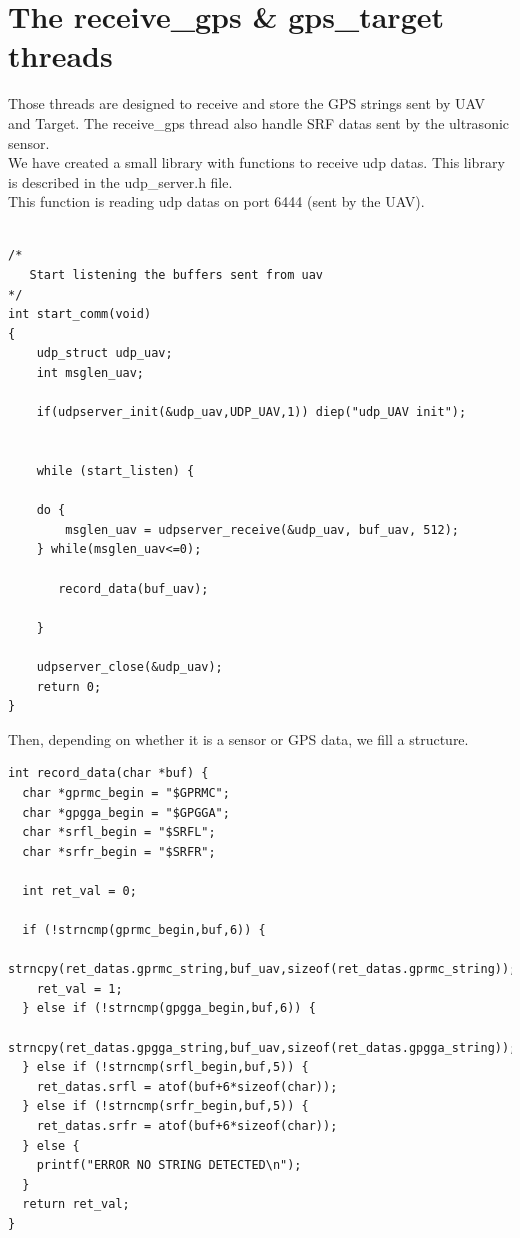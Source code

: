 \section{The receive\_gps \& gps\_target threads}

Those threads are designed to receive and store the GPS strings sent by UAV and Target. The receive\_gps thread also handle SRF datas sent by the ultrasonic sensor.\\

We have created a small library with functions to receive udp datas. This library is described in the udp\_server.h file.\\

This function is reading udp datas on port 6444 (sent by the UAV).\\

\begin{lstlisting}

/*
   Start listening the buffers sent from uav
*/
int start_comm(void)
{
    udp_struct udp_uav;
    int msglen_uav;
  
    if(udpserver_init(&udp_uav,UDP_UAV,1)) diep("udp_UAV init");


    while (start_listen) {

	do {
	    msglen_uav = udpserver_receive(&udp_uav, buf_uav, 512);	   
	} while(msglen_uav<=0);
	
       record_data(buf_uav);

    }
  
    udpserver_close(&udp_uav);
    return 0;
}

\end{lstlisting}

Then, depending on whether it is a sensor or GPS data, we fill a structure.\\

\begin{lstlisting}  
int record_data(char *buf) {
  char *gprmc_begin = "$GPRMC";
  char *gpgga_begin = "$GPGGA";
  char *srfl_begin = "$SRFL";
  char *srfr_begin = "$SRFR";

  int ret_val = 0;

  if (!strncmp(gprmc_begin,buf,6)) {
    strncpy(ret_datas.gprmc_string,buf_uav,sizeof(ret_datas.gprmc_string));
    ret_val = 1;
  } else if (!strncmp(gpgga_begin,buf,6)) {
    strncpy(ret_datas.gpgga_string,buf_uav,sizeof(ret_datas.gpgga_string));
  } else if (!strncmp(srfl_begin,buf,5)) {
    ret_datas.srfl = atof(buf+6*sizeof(char));
  } else if (!strncmp(srfr_begin,buf,5)) {
    ret_datas.srfr = atof(buf+6*sizeof(char));
  } else {
    printf("ERROR NO STRING DETECTED\n");
  }
  return ret_val;
}
\end{lstlisting}

